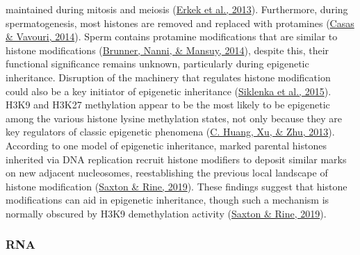 \documentclass[12pt,twoside]{reedthesis}
\begin{document}
maintained during mitosis and meiosis (\protect\hyperlink{ref-erkek2013}{Erkek et al., 2013}). Furthermore, during
spermatogenesis, most histones are removed and replaced with protamines
(\protect\hyperlink{ref-casas2014}{Casas \& Vavouri, 2014}). Sperm contains protamine modifications that are similar to
histone modifications (\protect\hyperlink{ref-brunner2014}{Brunner, Nanni, \& Mansuy, 2014}), despite this, their functional
significance remains unknown, particularly during epigenetic
inheritance. Disruption of the machinery that regulates histone
modification could also be a key initiator of epigenetic inheritance
(\protect\hyperlink{ref-siklenka2015}{Siklenka et al., 2015}). H3K9 and H3K27 methylation appear to be the most likely
to be epigenetic among the various histone lysine methylation states,
not only because they are key regulators of classic epigenetic phenomena
(\protect\hyperlink{ref-huang2013}{C. Huang, Xu, \& Zhu, 2013}). According to one model of epigenetic inheritance, marked
parental histones inherited via DNA replication recruit histone
modifiers to deposit similar marks on new adjacent nucleosomes,
reestablishing the previous local landscape of histone modification
(\protect\hyperlink{ref-saxton2019}{Saxton \& Rine, 2019}). These findings suggest that histone modifications can aid
in epigenetic inheritance, though such a mechanism is normally obscured
by H3K9 demethylation activity (\protect\hyperlink{ref-saxton2019}{Saxton \& Rine, 2019}).

\hypertarget{rna}{%
\subsubsection*{RNA}\label{rna}}
\end{document}

